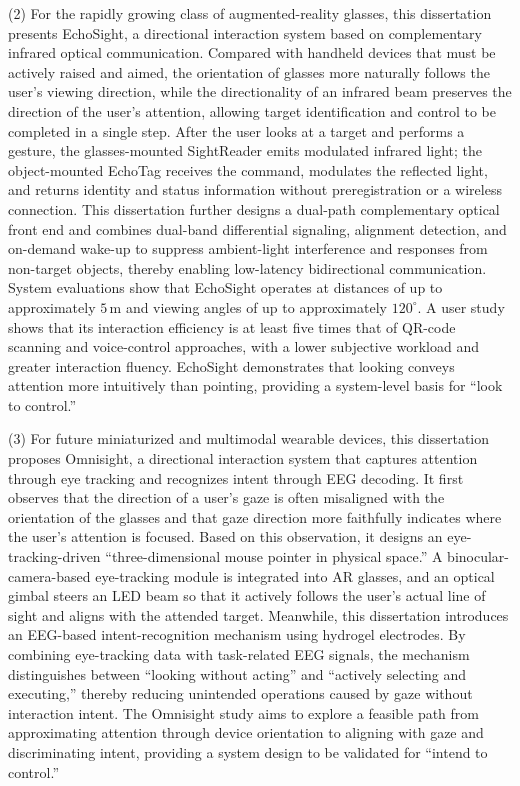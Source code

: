 \begin{eabstract}
(2) For the rapidly growing class of augmented-reality glasses, this dissertation presents EchoSight, a directional interaction system based on complementary infrared optical communication. Compared with handheld devices that must be actively raised and aimed, the orientation of glasses more naturally follows the user's viewing direction, while the directionality of an infrared beam preserves the direction of the user's attention, allowing target identification and control to be completed in a single step. After the user looks at a target and performs a gesture, the glasses-mounted SightReader emits modulated infrared light; the object-mounted EchoTag receives the command, modulates the reflected light, and returns identity and status information without preregistration or a wireless connection. This dissertation further designs a dual-path complementary optical front end and combines dual-band differential signaling, alignment detection, and on-demand wake-up to suppress ambient-light interference and responses from non-target objects, thereby enabling low-latency bidirectional communication. System evaluations show that EchoSight operates at distances of up to approximately $5\,\mathrm{m}$ and viewing angles of up to approximately $120^\circ$. A user study shows that its interaction efficiency is at least five times that of QR-code scanning and voice-control approaches, with a lower subjective workload and greater interaction fluency. EchoSight demonstrates that looking conveys attention more intuitively than pointing, providing a system-level basis for ``look to control.''

(3) For future miniaturized and multimodal wearable devices, this dissertation proposes Omnisight, a directional interaction system that captures attention through eye tracking and recognizes intent through EEG decoding. It first observes that the direction of a user's gaze is often misaligned with the orientation of the glasses and that gaze direction more faithfully indicates where the user's attention is focused. Based on this observation, it designs an eye-tracking-driven ``three-dimensional mouse pointer in physical space.'' A binocular-camera-based eye-tracking module is integrated into AR glasses, and an optical gimbal steers an LED beam so that it actively follows the user's actual line of sight and aligns with the attended target. Meanwhile, this dissertation introduces an EEG-based intent-recognition mechanism using hydrogel electrodes. By combining eye-tracking data with task-related EEG signals, the mechanism distinguishes between ``looking without acting'' and ``actively selecting and executing,'' thereby reducing unintended operations caused by gaze without interaction intent. The Omnisight study aims to explore a feasible path from approximating attention through device orientation to aligning with gaze and discriminating intent, providing a system design to be validated for ``intend to control.''
\end{eabstract}
